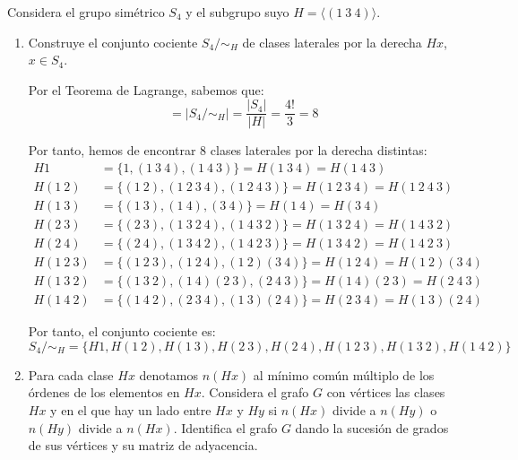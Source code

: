 \begin{ejercicio}\label{ej:1.41}
    Considera el grupo simétrico $S_4$ y el subgrupo suyo $H = \langle (1\ 3\ 4) \rangle$.
    \begin{enumerate}
        \item Construye el conjunto cociente $S_4/\sim_H$ de clases laterales por la derecha $Hx$, $x \in S_4$.
        
        Por el Teorema de Lagrange, sabemos que:
        \begin{equation*}
            [S_4:H]=\left|S_4/\sim_H\right|=\frac{|S_4|}{|H|}=\frac{4!}{3}=8
        \end{equation*}

        Por tanto, hemos de encontrar 8 clases laterales por la derecha distintas:
        \begin{align*}
            H1 &= \{1, (1\ 3\ 4), (1\ 4\ 3)\} = H(1\ 3\ 4) = H(1\ 4\ 3)\\
            H(1\ 2) &= \{(1\ 2), (1\ 2\ 3\ 4), (1\ 2\ 4\ 3)\} = H(1\ 2\ 3\ 4) = H(1\ 2\ 4\ 3)\\
            H(1\ 3) &= \{(1\ 3), (1\ 4), (3\ 4)\} = H(1\ 4) = H(3\ 4)\\
            H(2\ 3) &= \{(2\ 3), (1\ 3\ 2\ 4), (1\ 4\ 3\ 2)\} = H(1\ 3\ 2\ 4) = H(1\ 4\ 3\ 2)\\
            H(2\ 4) &= \{(2\ 4), (1\ 3\ 4\ 2), (1\ 4\ 2\ 3)\} = H(1\ 3\ 4\ 2) = H(1\ 4\ 2\ 3)\\
            H(1\ 2\ 3) &= \{(1\ 2\ 3), (1\ 2\ 4), (1\ 2)(3\ 4)\} = H(1\ 2\ 4) = H(1\ 2)(3\ 4)\\
            H(1\ 3\ 2) &= \{(1\ 3\ 2), (1\ 4)(2\ 3), (2\ 4\ 3)\} = H(1\ 4)(2\ 3) = H(2\ 4\ 3)\\
            H(1\ 4\ 2) &= \{(1\ 4\ 2), (2\ 3\ 4), (1\ 3)(2\ 4)\} = H(2\ 3\ 4) = H(1\ 3)(2\ 4)
        \end{align*}

        Por tanto, el conjunto cociente es:
        \begin{equation*}
            S_4/\sim_H=\{H1, H(1\ 2), H(1\ 3), H(2\ 3), H(2\ 4), H(1\ 2\ 3), H(1\ 3\ 2), H(1\ 4\ 2)\}
        \end{equation*}

        \item Para cada clase $Hx$ denotamos $n(Hx)$ al mínimo común múltiplo de los órdenes de los elementos en $Hx$. Considera el grafo $G$ con vértices las clases $Hx$ y en el que hay un lado entre $Hx$ y $Hy$ si $n(Hx)$ divide a $n(Hy)$ o $n(Hy)$ divide a $n(Hx)$. Identifica el grafo $G$ dando la sucesión de grados de sus vértices y su matriz de adyacencia.
        

\end{enumerate}
\end{ejercicio}

